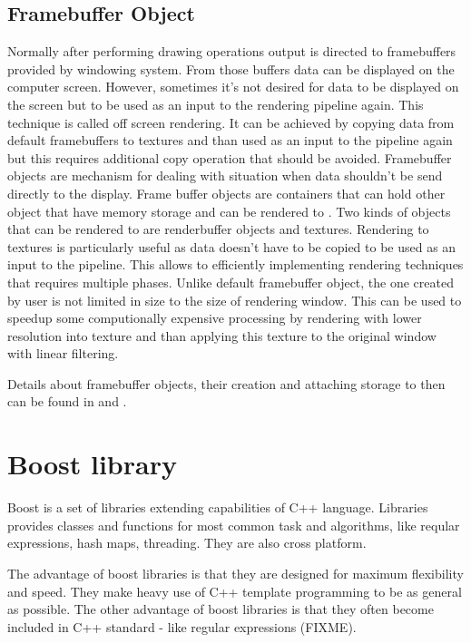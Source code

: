 \subsection{Framebuffer Object}
Normally after performing drawing operations output is directed to framebuffers provided by windowing system. From those buffers data can be displayed on the computer screen. However, sometimes it's not desired for data to be displayed on the screen but to be used as an input to the rendering pipeline again. This technique is called off screen rendering. It can be achieved by copying data from default framebuffers to textures and than used as an input to the pipeline again but this requires additional copy operation that should be avoided. Framebuffer objects are mechanism for dealing with situation when data shouldn't be send directly to the display. Frame buffer objects are containers that can hold other object that have memory storage and can be rendered to \cite[chapter~8]{OpenGLSuperbible}. Two kinds of objects that can be rendered to are renderbuffer objects and textures. Rendering to textures is particularly useful as data doesn't have to be copied to be used as an input to the pipeline. This allows to efficiently implementing rendering techniques that requires multiple phases.
Unlike default framebuffer object, the one created by user is not limited in size to the size of rendering window. This can be used to speedup some computionally expensive processing by rendering with lower resolution into texture and than applying this texture to the original window with linear filtering. 

Details about framebuffer objects, their creation and attaching storage to then can be found in \cite[chapter~8]{OpenGLSuperbible} and \cite[chapter~10]{RedBook}.

\section{Boost library}
Boost is a set of libraries extending capabilities of C++ language. Libraries provides classes and functions for most common task and algorithms, like reqular expressions, hash maps, threading. They are also cross platform. 

The advantage of boost libraries is that they are designed for maximum flexibility and speed. They make heavy use of C++ template programming to be as general as possible. The other advantage of boost libraries is that they often become included in C++ standard - like regular expressions (FIXME). 

